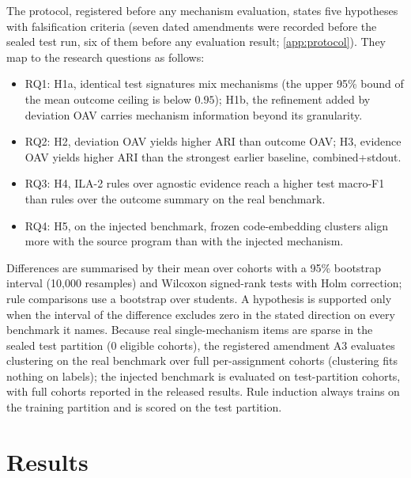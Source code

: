 \documentclass[a4paper,preprint,12pt,authoryear]{elsarticle}
\begin{document}
The protocol, registered before any mechanism evaluation, states five hypotheses with falsification criteria (seven dated amendments were recorded before the sealed test run, six of them before any evaluation result; \cref{app:protocol}). They map to the research questions as follows:
\begin{itemize}
\item RQ1: H1a, identical test signatures mix mechanisms (the upper 95\% bound of the mean outcome ceiling is below $0.95$); H1b, the refinement added by deviation OAV carries mechanism information beyond its granularity.
\item RQ2: H2, deviation OAV yields higher ARI than outcome OAV; H3, evidence OAV yields higher ARI than the strongest earlier baseline, combined+stdout.
\item RQ3: H4, ILA-2 rules over agnostic evidence reach a higher test macro-F1 than rules over the outcome summary on the real benchmark.
\item RQ4: H5, on the injected benchmark, frozen code-embedding clusters align more with the source program than with the injected mechanism.
\end{itemize}
Differences are summarised by their mean over cohorts with a 95\% bootstrap interval (10{,}000 resamples) and Wilcoxon signed-rank tests with Holm correction; rule comparisons use a bootstrap over students. A hypothesis is supported only when the interval of the difference excludes zero in the stated direction on every benchmark it names. Because real single-mechanism items are sparse in the sealed test partition (0 eligible cohorts), the registered amendment A3 evaluates clustering on the real benchmark over full per-assignment cohorts (clustering fits nothing on labels); the injected benchmark is evaluated on test-partition cohorts, with full cohorts reported in the released results. Rule induction always trains on the training partition and is scored on the test partition.

\section{Results}\label{sec:results}
\end{document}
